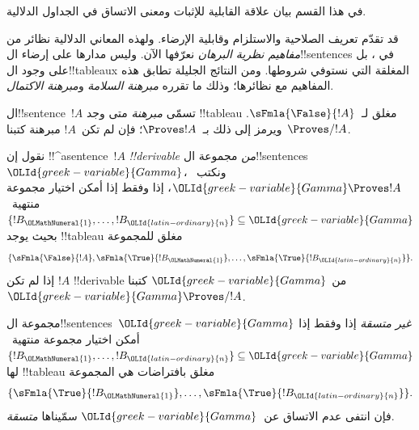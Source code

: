 \documentclass[../../../include/open-logic-section]{subfiles}
\begin{document}
      {}
      {}
      

\begin{editorial}
في هذا القسم بيان علاقة القابلية للإثبات ومعنى الاتساق في الجداول الدلالية.
\end{editorial}

\begin{explain}
قد تقدّم تعريف الصلاحية والاستلزام وقابلية الإرضاء. ولهذه المعاني
الدلالية نظائر من \emph{مفاهيم نظرية البرهان} نعرّفها الآن.
وليس مدارها على إرضاء ال!!{sentence}s في
، بل على وجود
ال!!{tableau}x المغلقة التي نستوفي شروطها. ومن النتائج الجليلة
تطابق هذه المفاهيم مع نظائرها؛ وذلك ما تقرره
\emph{مبرهنة السلامة} و\emph{مبرهنة الاكتمال}.
\end{explain}


\begin{defn}[المبرهنات]
ال!!{sentence}~$!A$ تسمّى \emph{مبرهنة} متى وجد !!{tableau} مغلق
لـ~$\sFmla{\False}{!A}$. ويرمز إلى ذلك بـ~$\Proves !A$؛
فإن لم تكن~$!A$ مبرهنة كتبنا~$\Proves/ !A$.
\end{defn}

\begin{defn}[!!^{derivability}]
نقول إن !!^a{sentence}~$!A$ \emph{!!{derivable} من} مجموعة
ال!!{sentence}s~$\OLId{greek-variable}{Gamma}$، ونكتب~$\OLId{greek-variable}{Gamma} \Proves !A$، إذا وفقط إذا
أمكن اختيار مجموعة منتهية~$\{!B_\OLMathNumeral{1}, \dots, !B_\OLId{latin-ordinary}{n}\} \subseteq \OLId{greek-variable}{Gamma}$
بحيث يوجد !!{tableau} مغلق للمجموعة
\[
\{
  \sFmla{\False}{!A},
  \sFmla{\True}{!B_\OLMathNumeral{1}}, \dots,
  \sFmla{\True}{!B_\OLId{latin-ordinary}{n}}
  \}.
\]
إذا لم تكن $!A$ !!{derivable} من $\OLId{greek-variable}{Gamma}$ كتبنا $\OLId{greek-variable}{Gamma} \Proves/
!A$.
\end{defn}

\begin{defn}[الاتساق]
مجموعة ال!!{sentence}s~$\OLId{greek-variable}{Gamma}$ \emph{غير متسقة} إذا وفقط إذا
أمكن اختيار مجموعة منتهية~$\{!B_\OLMathNumeral{1}, \dots, !B_\OLId{latin-ordinary}{n}\} \subseteq \OLId{greek-variable}{Gamma}$
لها !!{tableau} مغلق بافتراضات هي المجموعة
\[
\{
  \sFmla{\True}{!B_\OLMathNumeral{1}}, \dots,
  \sFmla{\True}{!B_\OLId{latin-ordinary}{n}}  
  \}.
\]
فإن انتفى عدم الاتساق عن~$\OLId{greek-variable}{Gamma}$ سمّيناها \emph{متسقة}.
\end{defn}
\end{document}
